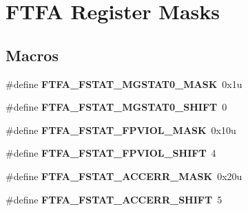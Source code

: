 \hypertarget{group___f_t_f_a___register___masks}{}\section{F\+T\+FA Register Masks}
\label{group___f_t_f_a___register___masks}
\subsection*{Macros}
\begin{DoxyCompactItemize}
\item 
\mbox{\label{group___f_t_f_a___register___masks_ga56163f418850b05a9fb528e94bbc026e}} 
\#define {\bfseries F\+T\+F\+A\+\_\+\+F\+S\+T\+A\+T\+\_\+\+M\+G\+S\+T\+A\+T0\+\_\+\+M\+A\+SK}~0x1u
\item 
\mbox{\label{group___f_t_f_a___register___masks_ga61b25328b4e91259c518051ad485c9e1}} 
\#define {\bfseries F\+T\+F\+A\+\_\+\+F\+S\+T\+A\+T\+\_\+\+M\+G\+S\+T\+A\+T0\+\_\+\+S\+H\+I\+FT}~0
\item 
\mbox{\label{group___f_t_f_a___register___masks_ga371bc7284b6d2e14f852e4e7e0316fef}} 
\#define {\bfseries F\+T\+F\+A\+\_\+\+F\+S\+T\+A\+T\+\_\+\+F\+P\+V\+I\+O\+L\+\_\+\+M\+A\+SK}~0x10u
\item 
\mbox{\label{group___f_t_f_a___register___masks_ga92718795ccbab208784ed798d252567e}} 
\#define {\bfseries F\+T\+F\+A\+\_\+\+F\+S\+T\+A\+T\+\_\+\+F\+P\+V\+I\+O\+L\+\_\+\+S\+H\+I\+FT}~4
\item 
\mbox{\label{group___f_t_f_a___register___masks_gaf7824945e3224ae270302e23286e9e34}} 
\#define {\bfseries F\+T\+F\+A\+\_\+\+F\+S\+T\+A\+T\+\_\+\+A\+C\+C\+E\+R\+R\+\_\+\+M\+A\+SK}~0x20u
\item 
\mbox{\label{group___f_t_f_a___register___masks_ga3bbe94d5c4203cd6eebe9e0e78f555aa}} 
\#define {\bfseries F\+T\+F\+A\+\_\+\+F\+S\+T\+A\+T\+\_\+\+A\+C\+C\+E\+R\+R\+\_\+\+S\+H\+I\+FT}~5
\item 
\mbox{\label{group___f_t_f_a___register___masks_ga96b65895e79e6256e4312d5677dd8ae2}} 

\end{DoxyCompactItemize}

